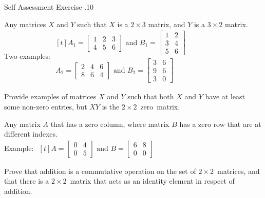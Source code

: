 \documentclass[\main/notes.tex]{subfiles}
\begin{document}
\begin{exercise}{Self Assessment Exercise \thechapter.10}
\begin{questions}
							\begin{answer}
								Any matrices $X$ and $Y$ such that $X$ is a $2 \times 3$ matrix, and $Y$ is a $3 \times 2$ matrix.\\
								Two examples: \quad
								$ \begin{aligned}[t]
									A_{1} = \begin{bmatrix}
										1 & 2 & 3\\
										4 & 5 & 6
									\end{bmatrix} \text{ and }
									B_{1} = \begin{bmatrix}
										1 & 2\\
										3 & 4\\
										5 & 6
									\end{bmatrix}\\
									A_{2} = \begin{bmatrix}
										2 & 4 & 6\\
										8 & 6 & 4
									\end{bmatrix} \text{ and }
									B_{2} = \begin{bmatrix}
										3 & 6\\
										9 & 6\\
										3 & 0
									\end{bmatrix}
								\end{aligned} $
							\end{answer}
						\item Provide examples of matrices $X$ and $Y$ such that both $X$ and $Y$ have at least some non-zero entries, but $XY$ is the $2 \times 2$~zero~matrix.\\
							\begin{answer}
								Any matrix $A$ that has a zero column, where matrix $B$ has a zero row that are at different indexes.\\
								Example: \quad $
								\begin{aligned}[t]
									A = \begin{bmatrix}
										0 & 4\\
										0 & 5
									\end{bmatrix} \text{ and }
									B = \begin{bmatrix}
										6 & 8\\
										0 & 0
									\end{bmatrix}
								\end{aligned}$
							\end{answer}
						\pagebreak
						\item Prove that addition is a commutative operation on the set of $2 \times 2$~matrices, and that there is a $2 \times 2$~matrix that acts as an identity element in respect of addition.

\end{questions}
\end{exercise}
\end{document}
